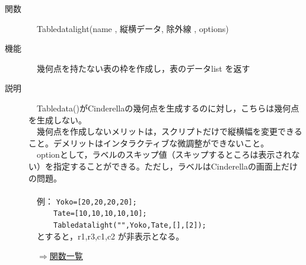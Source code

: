 \documentclass[papersize,a4paper,12pt,uplatex]{jsarticle}
\begin{document}
\begin{description}
\hypertarget{tabledatalight}{}
\item[関数]　Tabledatalight(name , 縦横データ, 除外線 , options)
\item[機能]　幾何点を持たない表の枠を作成し，表のデータlist を返す
\item[説明]　Tabledata()がCinderellaの幾何点を生成するのに対し，こちらは幾何点を生成しない。\\
　幾何点を作成しないメリットは，スクリプトだけで縦横幅を変更できること。デメリットはインタラクティブな微調整ができないこと。\\
　optionとして，ラベルのスキップ値（スキップするところは表示されない）を指定することができる。ただし，ラベルはCinderellaの画面上だけの問題。\\
　\\
　例： \verb|Yoko=[20,20,20,20];|\\
　　　\verb|Tate=[10,10,10,10,10];|\\
　　　\verb|Tabledatalight("",Yoko,Tate,[],[2]);|\\
　とすると，r1,r3,c1,c2 が非表示となる。\\


\begin{flushright}　\hyperlink{functionlist}{$\Rightarrow$関数一覧}\end{flushright}



\end{description}
\end{document}
